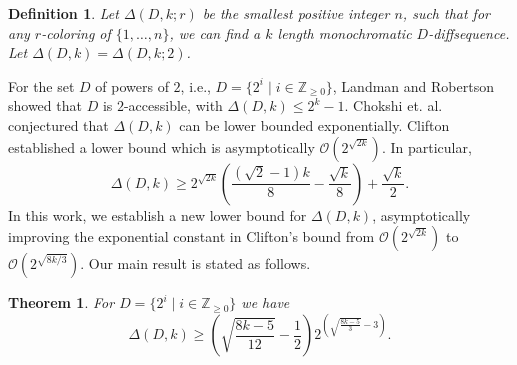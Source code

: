 \documentclass[10pt,a4paper]{amsart}
\newtheorem{theorem}{Theorem}
\newtheorem{definition}{Definition}
\begin{document}
\begin{definition}
    Let $\Delta(D,k;r)$ be the smallest positive integer $n$, such that for any $r$-coloring of $\{1, \ldots, n \}$, we can find a $k$ length monochromatic $D$-diffsequence. Let $\Delta(D,k) = \Delta(D,k;2)$.
\end{definition}

For the set $D$ of powers of $2$, i.e., $D = \{ 2^i \mid i \in \mathbb{Z}_{\ge 0}\}$, Landman and Robertson \cite{LR} showed that $D$ is $2$-accessible, with $\Delta(D,k) \le 2^k - 1$. Chokshi et. al. \cite{CCLS18} conjectured that $\Delta(D,k)$ can be lower bounded exponentially. Clifton \cite{Clifton} established a lower bound which is asymptotically $\mathcal{O}(2^{\sqrt{2k}})$. In particular,
\begin{equation}
    \Delta(D, k) \geq 2^{\sqrt{2k}} \left( \frac{(\sqrt{2} - 1)k}{8} - \frac{\sqrt{k}}{8} \right) + \frac{\sqrt{k}}{2}.
\end{equation}
In this work, we establish a new lower bound for $\Delta(D,k)$, asymptotically improving the exponential constant in Clifton's bound from $\mathcal{O}(2^{\sqrt{2k}})$ to $\mathcal{O}(2^{\sqrt{8k/3}})$. Our main result is stated as follows.  

\begin{theorem}\label{thm: MainThm}
    For $D=\{2^i\mid i\in\mathbb{Z}_{\ge0}\}$ we have
    \begin{equation}\label{Theone}
        \Delta(D,k)\ge \left(\sqrt{\frac{8k-5}{12}}-\frac12\right)2^{\left(\sqrt{\frac{8k-5}{3}}-3\right)}.
    \end{equation}
\end{theorem}
\end{document}
